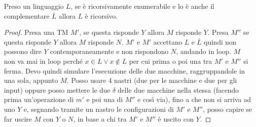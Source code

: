 \begin{teorema}
  Preso un linguaggio $L$, se è ricorsivamente enumerabile e lo è anche il
  complementare $\overline{L}$ allora $L$ è ricorsivo.
\end{teorema}
\begin{proof}
  Presa una TM $M'$, se questa risponde $Y$ allora $M$ risponde $Y$. Presa $M''$
  se questa risponde $Y$ allora $M$ risponde $N$. $M'$ e $M'$ accettano $L$ e
  $\overline{L}$ quindi non possono dire $Y$ contemporaneamente e non rispondono
  $N$, andando in loop. $M$ non va mai in loop perché $x\in L\lor x\not\in L$
  per cui prima o poi una tra $M'$ e $M''$ si ferma. Devo quindi simulare
  l'esecuzione delle due macchine, raggruppandole in una sola, appunto
  $M$. Posso usare 4 nastri (due per le macchine e due per gli input) oppure
  posso mettere le due $\delta$ delle due macchine nella stessa (facendo prima
  un'operazione di $m'$ e poi una di $M''$ e così via), fino a che non si arriva
  ad uno $Y$ e, segnando tramite un nastro le configurazioni di $M'$ e $M''$,
  posso capire se far uscire $M$ con $Y$ o $N$, in base a chi tra $M'$ e $M''$ è
  uscito con $Y$. 
\end{proof}
